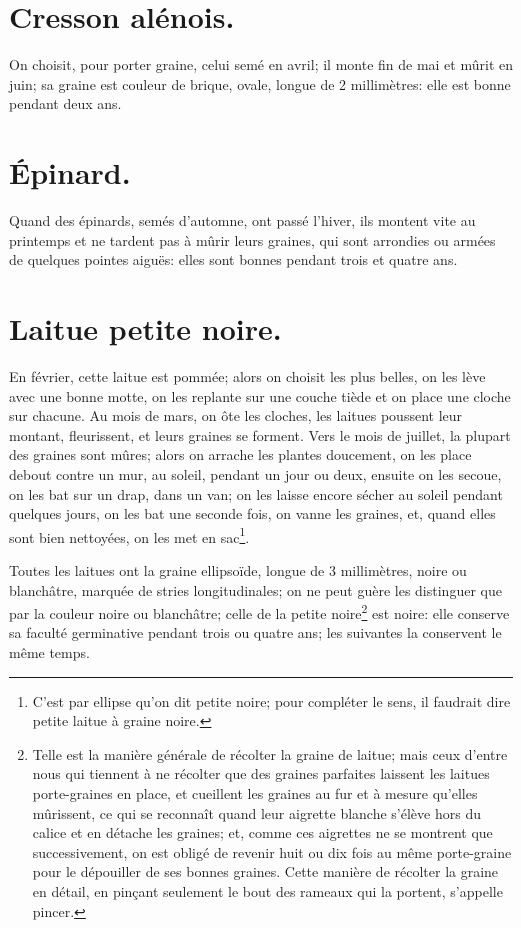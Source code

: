 \documentclass[10pt,a4paper]{book}
\begin{document}
\section{Cresson alénois.}

On choisit, pour porter graine, celui semé en avril; il monte fin de mai et mûrit en juin; sa graine est couleur de brique, ovale, longue de 2 millimètres: elle est bonne pendant deux ans.

\section{Épinard.}

Quand des épinards, semés d'automne, ont passé l'hiver, ils montent vite au printemps et ne tardent pas à mûrir leurs graines, qui sont arrondies ou armées de quelques pointes aiguës: elles sont bonnes pendant trois et quatre ans.

\section{Laitue petite noire.}

En février, cette laitue est pommée; alors on choisit les plus belles, on les lève avec une bonne motte, on les replante sur une couche tiède et on place une cloche sur chacune. Au mois de mars, on ôte les cloches, les laitues poussent leur montant, fleurissent, et leurs graines se forment. Vers le mois de juillet, la plupart des graines sont mûres; alors on arrache les plantes doucement, on les place debout contre un mur, au soleil, pendant un jour ou deux, ensuite on les secoue, on les bat sur un drap, dans un van; on les laisse encore sécher au soleil pendant quelques jours, on les bat une seconde fois, on vanne les graines, et, quand elles sont bien nettoyées, on les met en sac\footnote{C'est par ellipse qu'on dit petite noire; pour compléter le sens, il faudrait dire petite laitue à graine noire.}.

Toutes les laitues ont la graine ellipsoïde, longue de 3 millimètres, noire ou blanchâtre, marquée de stries longitudinales; on ne peut guère les distinguer que par la couleur noire ou blanchâtre; celle de la petite noire\footnote{Telle est la manière générale de récolter la graine de laitue; mais ceux d'entre nous qui tiennent à ne récolter que des graines parfaites laissent les laitues porte-graines en place, et cueillent les graines au fur et à mesure qu'elles mûrissent, ce qui se reconnaît quand leur aigrette blanche s'élève hors du calice et en détache les graines; et, comme ces aigrettes ne se montrent que successivement, on est obligé de revenir huit ou dix fois au même porte-graine pour le dépouiller de ses bonnes graines. Cette manière de récolter la graine en détail, en pinçant seulement le bout des rameaux qui la portent, s'appelle pincer.} est noire: elle conserve sa faculté germinative pendant trois ou quatre ans; les suivantes la conservent le même temps.
\end{document}
